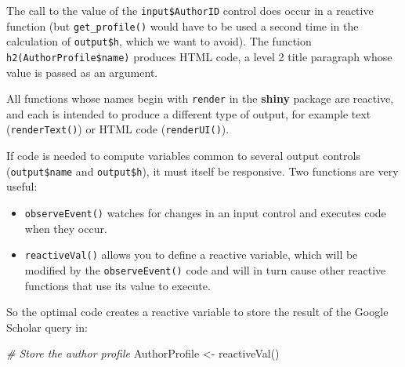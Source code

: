 \documentclass[
  12pt,
  american,
  a4paper,
  extrafontsizes,onecolumn,openright
  ]{memoir}
\newenvironment{Shaded}{\begin{snugshade}}{\end{snugshade}}
\newcommand{\CommentTok}[1]{\textcolor[rgb]{0.56,0.35,0.01}{\textit{#1}}}
\newcommand{\FunctionTok}[1]{\textcolor[rgb]{0.00,0.00,0.00}{#1}}
\newcommand{\NormalTok}[1]{#1}
\newcommand{\OtherTok}[1]{\textcolor[rgb]{0.56,0.35,0.01}{#1}}
\newcommand{\SpecialCharTok}[1]{\textcolor[rgb]{0.00,0.00,0.00}{#1}}
\providecommand{\tightlist}{%
  \setlength{\itemsep}{0pt}\setlength{\parskip}{0pt}}
\begin{document}
\begin{Shaded}
\end{Shaded}

\normalsize

The call to the value of the \texttt{input\$AuthorID} control does occur in a reactive function (but \texttt{get\_profile()} would have to be used a second time in the calculation of \texttt{output\$h}, which we want to avoid).
The function \texttt{h2(AuthorProfile\$name)} produces HTML code, a level 2 title paragraph whose value is passed as an argument.

All functions whose names begin with \texttt{render} in the \textbf{shiny} package are reactive, and each is intended to produce a different type of output, for example text (\texttt{renderText()}) or HTML code (\texttt{renderUI()}).

If code is needed to compute variables common to several output controls (\texttt{output\$name} and \texttt{output\$h}), it must itself be responsive.
Two functions are very useful:

\begin{itemize}
\tightlist
\item
  \texttt{observeEvent()} watches for changes in an input control and executes code when they occur.
\item
  \texttt{reactiveVal()} allows you to define a reactive variable, which will be modified by the \texttt{observeEvent()} code and will in turn cause other reactive functions that use its value to execute.
\end{itemize}

So the optimal code creates a reactive variable to store the result of the Google Scholar query in:

\scriptsize

\begin{Shaded}
\begin{Highlighting}[]
\CommentTok{\# Store the author profile}
\NormalTok{AuthorProfile }\OtherTok{\textless{}{-}} \FunctionTok{reactiveVal}\NormalTok{()}
\end{Highlighting}
\end{Shaded}
\end{document}
